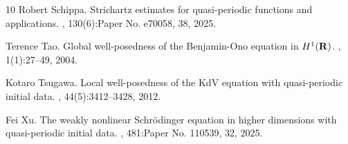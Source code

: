 \documentclass{amsart}
\theoremstyle{definition}
\begin{document}
\begin{thebibliography}{10}
Robert Schippa.
\newblock Strichartz estimates for quasi-periodic functions and applications.
, 130(6):Paper No. e70058, 38, 2025.

Terence Tao.
\newblock Global well-posedness of the {B}enjamin-{O}no equation in {$H^1({\bf
  R})$}.
, 1(1):27--49, 2004.

Kotaro Tsugawa.
\newblock Local well-posedness of the {K}d{V} equation with quasi-periodic
  initial data.
, 44(5):3412--3428, 2012.

Fei Xu.
\newblock The weakly nonlinear {S}chr\"{o}dinger equation in higher dimensions
  with quasi-periodic initial data.
, 481:Paper No. 110539, 32, 2025.

\end{thebibliography}
\end{document}
